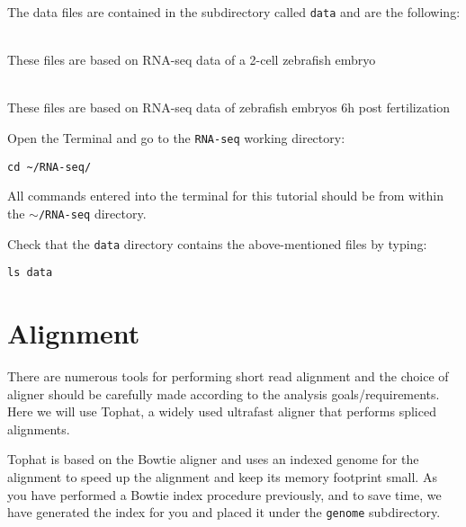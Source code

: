The data files are contained in the subdirectory called \texttt{data} and are
the following:
\begin{description}[style=multiline,labelindent=1.5cm,align=left,leftmargin=2.5cm]
  \item[\texttt{2cells\_1.fastq} and \texttt{2cells\_2.fastq}] \hfill\\
 These files are based on RNA-seq data of a 2-cell zebrafish embryo
  \item[\texttt{6h\_1.fastq} and \texttt{6h\_2.fastq}] \hfill\\
 These files are based on RNA-seq data of zebrafish embryos 6h post
 fertilization
\end{description}

\begin{steps}
Open the Terminal and go to the \texttt{RNA-seq} working directory:
\begin{lstlisting}
cd ~/RNA-seq/
\end{lstlisting}
\end{steps}

\begin{warning}
  All commands entered into the terminal for this tutorial should be from within the
  \texttt{$\sim$/RNA-seq} directory.
\end{warning}

\begin{steps}
Check that the \texttt{data} directory contains the above-mentioned files by typing:
\begin{lstlisting}
ls data
\end{lstlisting}
\end{steps}

\section{Alignment}
There are numerous tools for performing short read alignment and the choice of aligner
should be carefully made according to the analysis goals/requirements. Here we will
use Tophat, a widely used ultrafast aligner that performs spliced alignments.

Tophat is based on the Bowtie aligner and uses an indexed genome for the
alignment to speed up the alignment and keep its memory footprint small. As you
have performed a Bowtie index procedure previously, and to save time, we have
generated the index for you and placed it under the \texttt{genome}
subdirectory.

